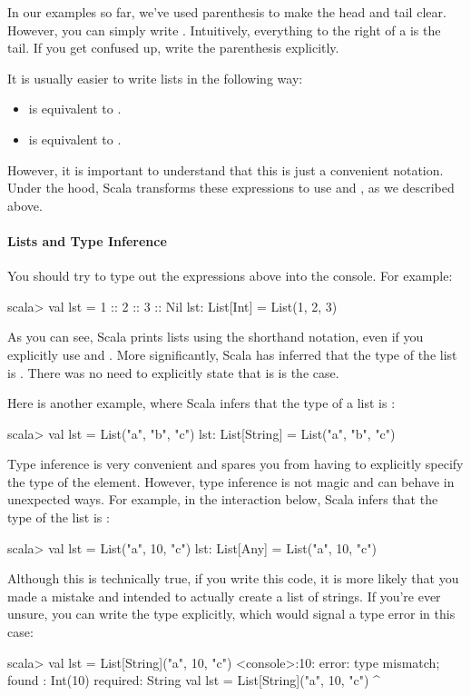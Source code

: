 \documentclass{book}
\begin{document}
In our examples so far, we've used parenthesis to make the head and tail clear.
However, you can simply write . Intuitively,
everything to the right of a \scalainline{::} is the tail. If you get confused
up, write the parenthesis explicitly.

It is usually easier to write lists in the following way:
%
\begin{itemize}

  \item {} is equivalent to
  .

  \item {} is equivalent to .

\end{itemize}
%
However, it is important to understand that this is just a convenient notation.
Under the hood, Scala transforms these expressions to use \scalainline{::}
and , as we described above.

\paragraph{Lists and Type Inference}

You should try to type out the expressions above into the \sbt{} console.
For example:
%
\begin{console}
scala> val lst = 1 :: 2 :: 3 :: Nil
lst: List[Int] = List(1, 2, 3)
\end{console}
%
As you can see, Scala prints lists using the shorthand notation,
even if you explicitly use \scalainline{::} and .
More significantly, Scala has inferred that the type of the list
is . There was no need to explicitly state that
is is the case.

Here is another example, where Scala infers that the type of a list is
:
%
\begin{console}
scala> val lst = List("a", "b", "c")
lst: List[String] = List("a", "b", "c")
\end{console}

Type inference is very convenient and spares you from having to explicitly
specify the type of the element. However, type inference is not magic
and can behave in unexpected ways. For example, in the interaction
below, Scala infers that the type of the list is :
%
\begin{console}
scala> val lst = List("a", 10, "c")
lst: List[Any] = List("a", 10, "c")
\end{console}
Although this is technically true, if you write this code, it is more
likely that you made a mistake and intended to actually create a list of
strings. If you're ever unsure, you can write the type explicitly, which
would signal a type error in this case:
\begin{console}
scala> val lst = List[String]("a", 10, "c")
<console>:10: error: type mismatch;
 found   : Int(10)
 required: String
       val lst = List[String]("a", 10, "c")
                                   ^
\end{console}
\end{document}
